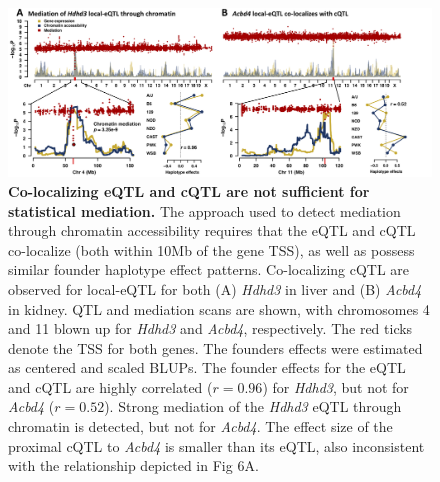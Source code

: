 \documentclass[10pt,letterpaper,twoside]{article}
\begin{document}
\clearpage

\begin{figure}[hp]
\renewcommand{\familydefault}{\sfdefault}\normalfont
\centering
\includegraphics[width=\textwidth]{figs/mediation_or_colocal.png}
\caption{\textbf{Co-localizing eQTL and cQTL are not sufficient for statistical mediation.} 
The approach used to detect mediation through chromatin accessibility requires that the eQTL and cQTL co-localize (both within 10Mb of the gene TSS), as well as possess similar founder haplotype effect patterns. Co-localizing cQTL are observed for local-eQTL for both (A) \textit{Hdhd3} in liver and (B) \textit{Acbd4} in kidney. QTL and mediation scans are shown, with chromosomes 4 and 11 blown up for \textit{Hdhd3} and \textit{Acbd4}, respectively. The red ticks denote the TSS for both genes. The founders effects were estimated as centered and scaled BLUPs. The founder effects for the eQTL and cQTL are highly correlated ($r = 0.96$) for \textit{Hdhd3}, but not for \textit{Acbd4} ($r = 0.52$). Strong mediation of the \textit{Hdhd3} eQTL through chromatin is detected, but not for \textit{Acbd4}. The effect size of the proximal cQTL to \textit{Acbd4} is smaller than its eQTL, also inconsistent with the relationship depicted in Fig 6A.
\label{fig:colocalization}}
\end{figure}

\clearpage
\end{document}
